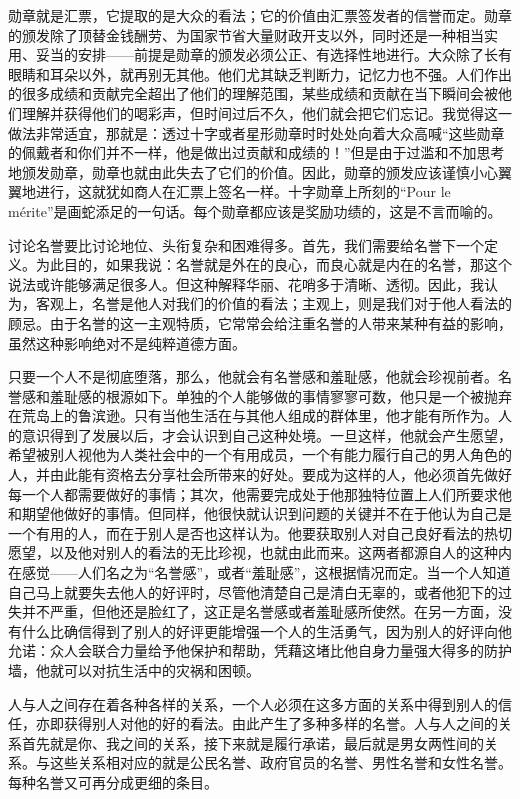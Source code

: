 \documentclass[12pt,oneside]{book}
\begin{document}
勋章就是汇票，它提取的是大众的看法；它的价值由汇票签发者的信誉而定。勋章的颁发除了顶替金钱酬劳、为国家节省大量财政开支以外，同时还是一种相当实用、妥当的安排——前提是勋章的颁发必须公正、有选择性地进行。大众除了长有眼睛和耳朵以外，就再别无其他。他们尤其缺乏判断力，记忆力也不强。人们作出的很多成绩和贡献完全超出了他们的理解范围，某些成绩和贡献在当下瞬间会被他们理解并获得他们的喝彩声，但时间过后不久，他们就会把它们忘记。我觉得这一做法非常适宜，那就是：透过十字或者星形勋章时时处处向着大众高喊“这些勋章的佩戴者和你们并不一样，他是做出过贡献和成绩的！”但是由于过滥和不加思考地颁发勋章，勋章也就由此失去了它们的价值。因此，勋章的颁发应该谨慎小心翼翼地进行，这就犹如商人在汇票上签名一样。十字勋章上所刻的“Pour le mérite”是画蛇添足的一句话。每个勋章都应该是奖励功绩的，这是不言而喻的。 

讨论名誉要比讨论地位、头衔复杂和困难得多。首先，我们需要给名誉下一个定义。为此目的，如果我说：名誉就是外在的良心，而良心就是内在的名誉，那这个说法或许能够满足很多人。但这种解释华丽、花哨多于清晰、透彻。因此，我认为，客观上，名誉是他人对我们的价值的看法；主观上，则是我们对于他人看法的顾忌。由于名誉的这一主观特质，它常常会给注重名誉的人带来某种有益的影响，虽然这种影响绝对不是纯粹道德方面。 

只要一个人不是彻底堕落，那么，他就会有名誉感和羞耻感，他就会珍视前者。名誉感和羞耻感的根源如下。单独的个人能够做的事情寥寥可数，他只是一个被抛弃在荒岛上的鲁滨逊。只有当他生活在与其他人组成的群体里，他才能有所作为。人的意识得到了发展以后，才会认识到自己这种处境。一旦这样，他就会产生愿望，希望被别人视他为人类社会中的一个有用成员，一个有能力履行自己的男人角色的人，并由此能有资格去分享社会所带来的好处。要成为这样的人，他必须首先做好每一个人都需要做好的事情；其次，他需要完成处于他那独特位置上人们所要求他和期望他做好的事情。但同样，他很快就认识到问题的关键并不在于他认为自己是一个有用的人，而在于别人是否也这样认为。他要获取别人对自己良好看法的热切愿望，以及他对别人的看法的无比珍视，也就由此而来。这两者都源自人的这种内在感觉——人们名之为“名誉感”，或者“羞耻感”，这根据情况而定。当一个人知道自己马上就要失去他人的好评时，尽管他清楚自己是清白无辜的，或者他犯下的过失并不严重，但他还是脸红了，这正是名誉感或者羞耻感所使然。在另一方面，没有什么比确信得到了别人的好评更能增强一个人的生活勇气，因为别人的好评向他允诺：众人会联合力量给予他保护和帮助，凭藉这堵比他自身力量强大得多的防护墙，他就可以对抗生活中的灾祸和困顿。 

人与人之间存在着各种各样的关系，一个人必须在这多方面的关系中得到别人的信任，亦即获得别人对他的好的看法。由此产生了多种多样的名誉。人与人之间的关系首先就是你、我之间的关系，接下来就是履行承诺，最后就是男女两性间的关系。与这些关系相对应的就是公民名誉、政府官员的名誉、男性名誉和女性名誉。每种名誉又可再分成更细的条目。 
\end{document}
